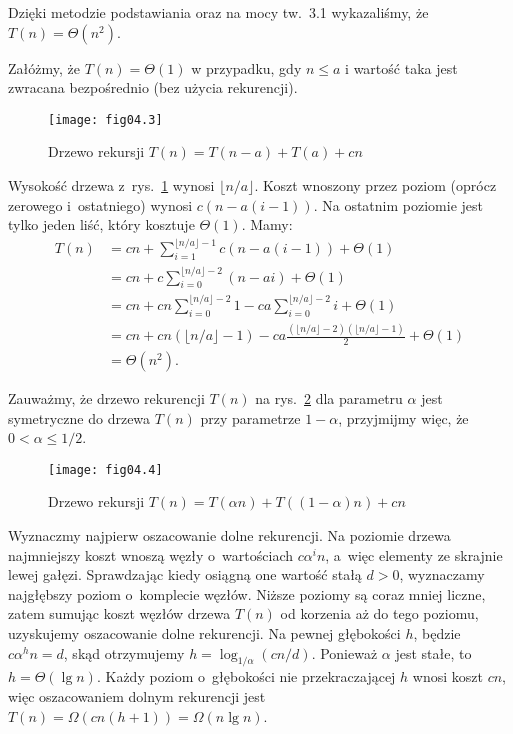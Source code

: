 Dzięki metodzie podstawiania oraz na mocy tw.~3.1 wykazaliśmy, że $T(n)=\Theta(n^2)$.

\exercise %
Załóżmy, że $T(n)=\Theta(1)$ w przypadku, gdy $n\le a$ i wartość taka jest zwracana bezpośrednio (bez użycia rekurencji).
\begin{figure}[ht]
	\begin{center}
		\texttt{[image: fig04.3]}
	\end{center}
	\caption{Drzewo rekursji $T(n)=T(n-a)+T(a)+cn$} \label{fig:4.2-4}
\end{figure}
Wysokość drzewa z~rys.~\ref{fig:4.2-4} wynosi $\lfloor n/a\rfloor$. Koszt wnoszony przez  poziom (oprócz zerowego i~ostatniego) wynosi $c(n-a(i-1))$. Na ostatnim poziomie jest tylko jeden liść, który kosztuje $\Theta(1)$. Mamy:
\begin{align*}
	T(n) &= cn+\sum_{i=1}^{\lfloor n/a\rfloor-1}c(n-a(i-1))+\Theta(1) \\
	&= cn+c\sum_{i=0}^{\lfloor n/a\rfloor-2}(n-ai)+\Theta(1) \\
	&= cn+cn\sum_{i=0}^{\lfloor n/a\rfloor-2}1-ca\sum_{i=0}^{\lfloor n/a\rfloor-2}i+\Theta(1) \\
	&= cn+cn(\lfloor n/a\rfloor-1)-ca\frac{(\lfloor n/a\rfloor-2)(\lfloor n/a\rfloor-1)}{2}+\Theta(1) \\[2mm]
	&= \Theta(n^2).
\end{align*}

\exercise %
Zauważmy, że drzewo rekurencji $T(n)$ na rys.~\ref{fig:4.2-5} dla parametru $\alpha$ jest symetryczne do drzewa $T(n)$ przy parametrze $1-\alpha$, przyjmijmy więc, że $0<\alpha\le1/2$.
\begin{figure}[ht]
	\begin{center}
		\texttt{[image: fig04.4]}
	\end{center}
	\caption{Drzewo rekursji $T(n)=T(\alpha n)+T((1-\alpha)n)+cn$} \label{fig:4.2-5}
\end{figure}

Wyznaczmy najpierw oszacowanie dolne rekurencji. Na  poziomie drzewa najmniejszy koszt wnoszą węzły o~wartościach $c\alpha^in$, a~więc elementy ze skrajnie lewej gałęzi. Sprawdzając kiedy osiągną one wartość stałą $d>0$, wyznaczamy najgłębszy poziom o~komplecie węzłów. Niższe poziomy są coraz mniej liczne, zatem sumując koszt węzłów drzewa $T(n)$ od korzenia aż do tego poziomu, uzyskujemy oszacowanie dolne rekurencji. Na pewnej głębokości $h$, będzie $c\alpha^hn=d$, skąd otrzymujemy $h=\log_{1/\alpha}(cn/d)$. Ponieważ $\alpha$ jest stałe, to $h=\Theta(\lg n)$. Każdy poziom o~głębokości nie przekraczającej $h$ wnosi koszt $cn$, więc oszacowaniem dolnym rekurencji jest $T(n)=\Omega(cn(h+1))=\Omega(n\lg n)$.

